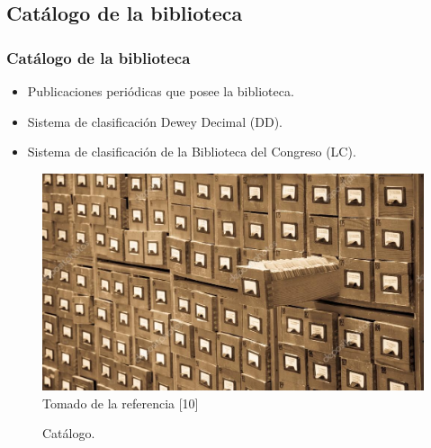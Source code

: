 \documentclass{beamer}
\begin{document}
    \subsection{Cat\'alogo de la biblioteca}
        \begin{frame}\frametitle{Cat\'alogo de la biblioteca}
            \begin{itemize}
                \item Publicaciones peri\'odicas que posee la biblioteca.                
                \item Sistema de clasificaci\'on Dewey Decimal (DD).
                \item Sistema de clasificaci\'on de la Biblioteca del Congreso (LC).                 
            \end{itemize} 
            \begin{figure}
                \includegraphics[scale=0.15]{figures/catalogoBiblioteca}
                \newline
                {\tiny Tomado de la referencia [10] }
                \caption{ Cat\'alogo. }
            \end{figure}      
        \end{frame}
\end{document}

